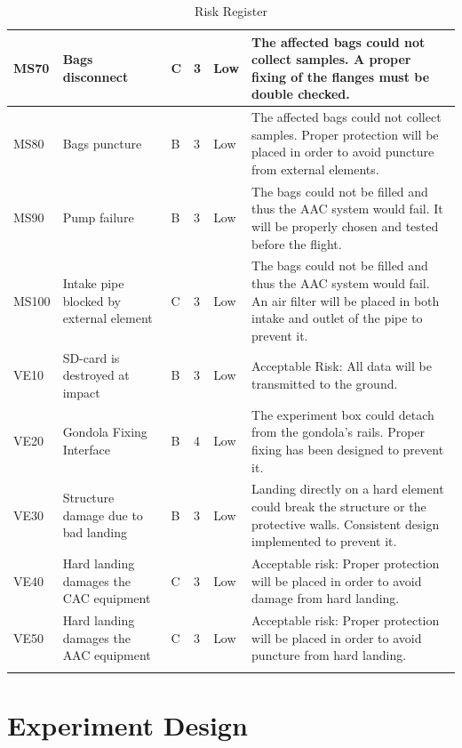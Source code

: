 \documentclass[a4paper,12pt,twoside]{article}
\begin{document}
\begin{landscape}
\begin{longtable}{|m{}| m{} |m{} |m{}|m{}| m{}|}
MS70 & Bags disconnect & C & 3 & \cellcolor[HTML]{FCFF2F}Low & The affected bags could not collect samples. A proper fixing of the flanges must be double checked.
\\ \hline
MS80 & Bags puncture & B & 3 & \cellcolor[HTML]{FCFF2F}Low & The affected bags could not collect samples. Proper protection will be placed in order to avoid puncture from external elements. \\ \hline
MS90 & Pump failure & B & 3 & \cellcolor[HTML]{FCFF2F}Low & The bags could not be filled and thus the AAC system would fail. It will be properly chosen and tested before the flight. \\ \hline
MS100 & Intake pipe blocked by external element & C & 3 & \cellcolor[HTML]{FCFF2F}Low & The bags could not be filled and thus the AAC system would fail. An air filter will be placed in both intake and outlet of the pipe to prevent it. \\ \hline
VE10 & SD-card is destroyed at impact & B & 3 & \cellcolor[HTML]{FCFF2F}Low & Acceptable Risk: All data will be transmitted to the ground. \\ \hline
VE20 & Gondola Fixing Interface & B & 4 & \cellcolor[HTML]{FCFF2F}Low & The experiment box could detach from the gondola’s rails. Proper fixing has been designed to prevent it. \\ \hline
VE30 & Structure damage due to bad landing & B & 3 & \cellcolor[HTML]{FCFF2F}Low & Landing directly on a hard element could break the structure or the protective walls. Consistent design implemented to prevent it. \\ \hline
VE40 & Hard landing damages the CAC equipment & C & 3 & \cellcolor[HTML]{FCFF2F}Low & Acceptable risk:  Proper  protection will be placed in order to avoid damage from hard landing. \\ \hline
VE50 & Hard landing damages the AAC equipment & C & 3 & \cellcolor[HTML]{FCFF2F}Low & Acceptable risk:  Proper  protection will be placed in order to avoid puncture from hard landing. \\ \hline

\caption{Risk Register}
\label{tab:risk-register}
\end{longtable}
\raggedbottom
\end{landscape}

\pagebreak
\section{Experiment Design}
\end{document}
